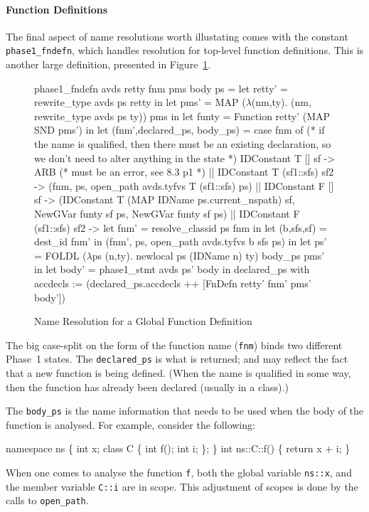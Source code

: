 \documentclass[11pt]{article}
\begin{document}
\paragraph{Function Definitions} The final aspect of name resolutions
worth illustating comes with the constant
\texttt{phase1_fndefn},
which handles resolution for top-level function definitions.  This is
another large definition, presented in Figure~\ref{fig:phase1-fndefn}.
\begin{figure}[htbp]
\begin{stdrule}
   phase1_fndefn avds retty fnm pms body ps =
     let retty' = rewrite_type avds ps retty in
     let pms' =
       MAP (\(\lambda\)(nm,ty). (nm, rewrite_type avds ps ty)) pms in
     let funty = Function retty' (MAP SND pms') in
     let (fnm',declared_ps, body_ps) =
       case fnm of (* if the name is qualified, then there must be an
                      existing declaration, so we don't need to alter
                      anything in the state *)
          IDConstant T [] sf -> ARB (* must be an error, see 8.3 p1 *)
       || IDConstant T (sf1::sfs) sf2 ->
             (fnm, ps, open_path avds.tyfvs T (sf1::sfs) ps)
       || IDConstant F [] sf ->
             (IDConstant T (MAP IDName ps.current_nspath) sf,
              NewGVar funty sf ps,
              NewGVar funty sf ps)
       || IDConstant F (sf1::sfs) sf2 ->
             let fnm' = resolve_classid ps fnm in
             let (b,sfs,sf) = dest_id fnm'
             in
               (fnm', ps, open_path avds.tyfvs b sfs ps)
     in
     let ps' =
       FOLDL (\(\lambda\)ps (n,ty).
                  newlocal ps (IDName n) ty) body_ps pms' in
     let body' = phase1_stmt avds ps' body
     in
       declared_ps with
         accdecls := (declared_ps.accdecls ++
                      [FnDefn retty' fnm' pms' body'])
\end{stdrule}
\caption{Name Resolution for a Global Function Definition}
\label{fig:phase1-fndefn}
\end{figure}
The big case-split on the form of the function name (\texttt{fnm})
binds two different Phase~1 states.  The \texttt{declared_ps} is what
is returned; and may reflect the fact that a new function is being
defined.  (When the name is qualified in some way, then the function
has already been declared (usually in a class).)

The \texttt{body_ps} is the name information that needs to be used
when the body of the function is analysed.  For example, consider the
following:
\begin{stdrule}
   namespace ns \{
     int x;
     class C \{ int f(); int i; \};
   \}
   int ns::C::f() \{ return x + i; \}
\end{stdrule}
When one comes to analyse the function \texttt{f}, both the global
variable \texttt{ns::x}, and the member variable \texttt{C::i} are in
scope.  This adjustment of scopes is done by the calls to
\texttt{open_path}.
\end{document}
